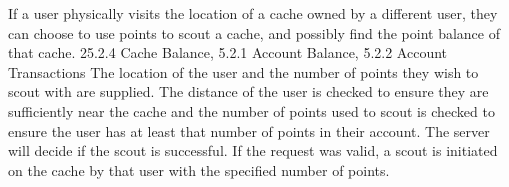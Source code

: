{    {\footnotesize
            {If a user physically visits the location of a cache owned by a different user, they can choose to use points to scout a cache, and possibly find the point balance of that cache.}
            {2}{5.2.4 Cache Balance, 5.2.1 Account Balance, 5.2.2 Account Transactions}
            {The location of the user and the number of points they wish to scout with are supplied.}
            {The distance of the user is checked to ensure they are sufficiently near the cache and the number of points used to scout is checked to ensure the user has at least that number of points in their account. The server will decide if the scout is successful.}
            {If the request was valid, a scout is initiated on the cache by that user with the specified number of points.}
    }
}
